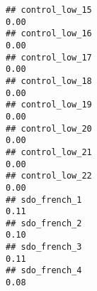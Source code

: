 \documentclass[
]{article}
\begin{document}
\begin{verbatim}
## control_low_15                                                                                                                                                                                                               0.00
## control_low_16                                                                                                                                                                                                               0.00
## control_low_17                                                                                                                                                                                                               0.00
## control_low_18                                                                                                                                                                                                               0.00
## control_low_19                                                                                                                                                                                                               0.00
## control_low_20                                                                                                                                                                                                               0.00
## control_low_21                                                                                                                                                                                                               0.00
## control_low_22                                                                                                                                                                                                               0.00
## sdo_french_1                                                                                                                                                                                                                 0.11
## sdo_french_2                                                                                                                                                                                                                 0.10
## sdo_french_3                                                                                                                                                                                                                 0.11
## sdo_french_4                                                                                                                                                                                                                 0.08

\end{verbatim}
\end{document}
